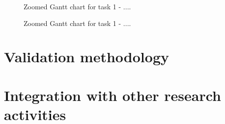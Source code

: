 \begin{figure}[htpb]
    \centering
    \missingfigure{}
    \caption{Zoomed Gantt chart for task 1 - ....}
    \label{fig:task3}
\end{figure}

\begin{figure}[htpb]
    \centering
    \missingfigure{}
    \caption{Zoomed Gantt chart for task 1 - ....}
    \label{fig:task4}
\end{figure}

\section{Validation methodology}%
\label{sec:validation_methodology}

\section{Integration with other research activities}%
\label{sec:integration_with_other_research_activities}







